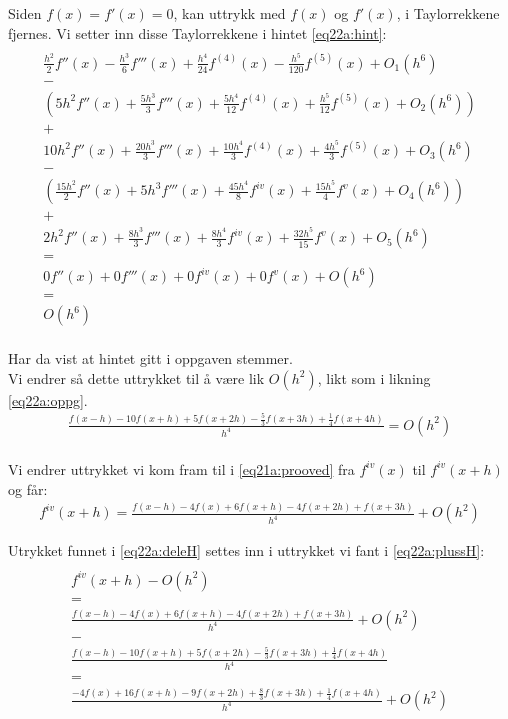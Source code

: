 Siden $f(x) = f'(x) = 0$, kan uttrykk med $f(x)$ og $f'(x)$, i Taylorrekkene fjernes. Vi setter inn disse Taylorrekkene i hintet  \ref{eq22a:hint}: 
\begin{multline}
\\ \frac{h^2}{2}f''(x)-\frac{h^3}{6}f'''(x)+\frac{h^4}{24}f^{(4)}(x)-\frac{h^5}{120}f^{(5)}(x)+{O_1}(h^6) \\
-\\
(5{h^2}f''(x) + \frac{{5{h^3}}}{3}f'''(x) + \frac{{5{h^4}}}{{12}}{f^{(4)}}(x) + \frac{{{h^5}}}{{12}}{f^{(5)}}(x) + {O_2}(h^6)) \\
+ \\
10{h^2}f''(x) + \frac{{20{h^3}}}{3}f'''(x) + \frac{{10{h^4}}}{3}{f^{(4)}}(x) + \frac{{4{h^5}}}{3}{f^{(5)}}(x) + {O_3}(h^6) \\
- \\
(\frac{{15{h^2}}}{2}f''(x) + 5{h^3}f'''(x) + \frac{{45{h^4}}}{8}{f^{iv}}(x) + \frac{{15{h^5}}}{4}{f^v}(x) + {O_4}(h^6)) \\
+ \\
2{h^2}f''(x) + \frac{{8{h^3}}}{3}f'''(x) + \frac{{8{h^4}}}{3}{f^{iv}}(x) + \frac{{32{h^5}}}{{15}}{f^v}(x) + {O_5}(h^6) \\
= \\
0f''(x)+0f'''(x)+0f^{iv}(x)+0f^{v}(x)+O(h^6) \\
= \\
O(h^6) \\
\end{multline}


Har da vist at hintet gitt i oppgaven stemmer. \\ 
Vi endrer så dette uttrykket til å være lik $O(h^2)$, likt som i likning \ref{eq22a:oppg}. 
\begin{align}
\frac{f(x-h)-10f(x+h)+5f(x+2h)-\frac{5}{3}f(x+3h)+\frac{1}{4}f(x+4h)}{h^4}=O(h^2) 
\label{eq22a:deleH} \\ \nonumber
\end{align}


Vi endrer uttrykket vi kom fram til i \ref{eq21a:prooved} fra ${f^{iv}}(x)$ til ${f^{iv}}(x + h)$ og får: 
\begin{align}
{f^{iv}}(x + h) = \frac{{f(x - h) - 4f(x) + 6f(x + h) - 4f(x + 2h) + f(x + 3h)}}{{{h^4}}} + O({h^2}) \label{eq22a:plussH} 
\end{align}


Utrykket funnet i \ref{eq22a:deleH} settes inn i uttrykket vi fant i \ref{eq22a:plussH}:
\begin{multline}
\\{f^{iv}}(x + h) - O(h^2) \\
= \\
\frac{f(x-h)-4f(x)+6f(x+h)-4f(x+2h)+f(x+3h)}{h^4}+O(h^2) \\
- \\
\frac{f(x-h)-10f(x+h)+5f(x+2h)-\frac{5}{3}f(x+3h)+\frac{1}{4}f(x+4h)}{h^4} \\
= \\
\frac{-4f(x)+16f(x+h)-9f(x+2h)+\frac{8}{3}f(x+3h)+\frac{1}{4}f(x+4h)}{h^4}+O(h^2) \\ \nonumber \\ \nonumber
\end{multline}

